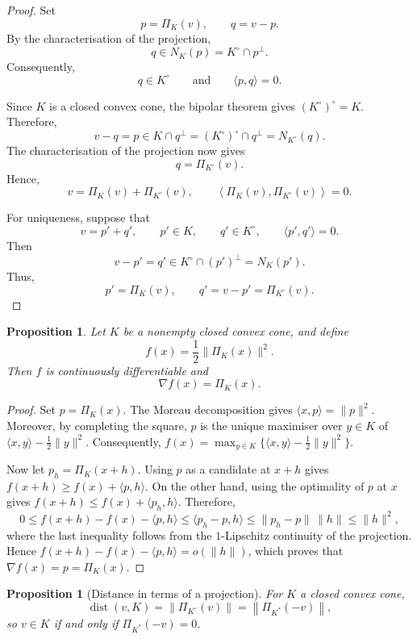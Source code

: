 \documentclass[a4paper,11pt]{book}
\theoremstyle{plain}
\newtheorem{proposition}[theorem]{Proposition}
\theoremstyle{definition}
\theoremstyle{remark}
\numberwithin{equation}{chapter}
\numberwithin{algorithm}{chapter}
\newcommand{\proj}[2]{\Pi_{#2}\!\left(#1\right)}
\newcommand{\norm}[1]{\left\|#1\right\|}
\DeclareMathOperator{\dist}{dist}
\begin{document}
	\begin{proof}
		Set
		\[
		p=\proj{v}{K},
		\qquad
		q=v-p.
		\]
		By the characterisation of the projection,
		\[
		q\in N_K(p)=K^\circ\cap p^\perp.
		\]
		Consequently,
		\[
		q\in K^\circ
		\qquad\text{and}\qquad
		\langle p,q\rangle=0.
		\]
		
		Since $K$ is a closed convex cone, the bipolar theorem gives
		$(K^\circ)^\circ=K$. Therefore,
		\[
		v-q=p
		\in K\cap q^\perp
		=(K^\circ)^\circ\cap q^\perp
		=N_{K^\circ}(q).
		\]
		The characterisation of the projection now gives
		\[
		q=\proj{v}{K^\circ}.
		\]
		Hence,
		\[
		v=\proj{v}{K}+\proj{v}{K^\circ},
		\qquad
		\left\langle\proj{v}{K},\proj{v}{K^\circ}\right\rangle=0.
		\]
		
		For uniqueness, suppose that
		\[
		v=p'+q',
		\qquad
		p'\in K,
		\qquad
		q'\in K^\circ,
		\qquad
		\langle p',q'\rangle=0.
		\]
		Then
		\[
		v-p'=q'\in K^\circ\cap(p')^\perp=N_K(p').
		\]
		Thus,
		\[
		p'=\proj{v}{K},
		\qquad
		q'=v-p'=\proj{v}{K^\circ}.
		\]
	\end{proof}
	\begin{proposition}
		Let $K$ be a nonempty closed convex cone, and define
		\[
		f(x)=\frac12\|\Pi_K(x)\|^2.
		\]
		Then $f$ is continuously differentiable and
		\[
		\nabla f(x)=\Pi_K(x).
		\]
		
	\end{proposition}
	
	\begin{proof}
		Set $p=\Pi_K(x)$. The Moreau decomposition gives
		$\langle x,p\rangle=\|p\|^2$. Moreover, by completing the square, $p$ is the
		unique maximiser over $y\in K$ of
		$\langle x,y\rangle-\frac12\|y\|^2$. Consequently,
		$f(x)=\max_{y\in K}\{\langle x,y\rangle-\frac12\|y\|^2\}$.
		
		Now let $p_h=\Pi_K(x+h)$. Using $p$ as a candidate at $x+h$ gives
		$f(x+h)\geq f(x)+\langle p,h\rangle$. On the other hand, using the optimality
		of $p$ at $x$ gives
		$f(x+h)\leq f(x)+\langle p_h,h\rangle$. Therefore,
		\[
		0
		\leq
		f(x+h)-f(x)-\langle p,h\rangle
		\leq
		\langle p_h-p,h\rangle
		\leq
		\|p_h-p\|\,\|h\|
		\leq
		\|h\|^2,
		\]
		where the last inequality follows from the $1$-Lipschitz continuity of the
		projection. Hence
		$f(x+h)-f(x)-\langle p,h\rangle=o(\|h\|)$, which proves that
		$\nabla f(x)=p=\Pi_K(x)$. 
	\end{proof}
	\begin{proposition}[Distance in terms of a projection]
		For $K$ a closed convex cone,
		\begin{equation}
			\dist(v,K)=\norm{\proj{v}{K^\circ}}=\norm{\proj{-v}{K^*}} ,
		\end{equation}
		so $v\in K$ if and only if $\proj{-v}{K^*}=0$.
	\end{proposition}
	
\end{document}
